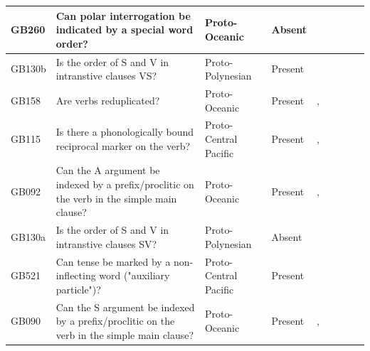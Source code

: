 \documentclass[a4paper,10pt]{article} %
\begin{document}
\begin{landscape}
\begin{longtable}{| p{2cm}| p{3cm}| p{2.5cm}|p{2cm}|p{2cm}|p{2cm}|p{2cm}|p{2cm}|p{2cm}|}
GB260&Can polar interrogation be indicated by a special word order?&Proto-Oceanic&Absent&\citet[89]{lynchrosscrowley_proto_grammar_oceanic}& \cellcolor{hedvig_lightgreen!50}{True Negative} & \cellcolor{hedvig_yellow!50}{Half} & \cellcolor{hedvig_yellow!50}{True Negative} & \cellcolor{hedvig_yellow!50}{True Negative} \\ \hline
GB130b&Is the order of S and V in intranstive clauses VS?&Proto-Polynesian&Present&\citet[122]{kikusawa2002proto}& \cellcolor{hedvig_yellow!50}{Half} & \cellcolor{hedvig_yellow!50}{Half} & \cellcolor{hedvig_lightgreen!50}{True Positive} & \cellcolor{hedvig_lightgreen!50}{True Positive} \\ \hline
GB158&Are verbs reduplicated?&Proto-Oceanic&Present&\citet[84]{lynchrosscrowley_proto_grammar_oceanic}, \citet[112]{evans2003study}& \cellcolor{hedvig_yellow!50}{Half} & \cellcolor{hedvig_yellow!50}{Half} & \cellcolor{hedvig_lightgreen!50}{True Positive} & \cellcolor{hedvig_lightgreen!50}{True Positive} \\ \hline
GB115&Is there a phonologically bound reciprocal marker on the verb?&Proto-Central Pacific&Present&\citet[352]{pawley1970change}, \citet[83]{lynchrosscrowley_proto_grammar_oceanic}& \cellcolor{hedvig_lightgreen!50}{True Positive} & \cellcolor{hedvig_yellow!50}{Half} & \cellcolor{hedvig_lightgreen!50}{True Positive} & \cellcolor{hedvig_yellow!50}{Half} \\ \hline
GB092&Can the A argument be indexed by a prefix/proclitic on the verb in the simple main clause?&Proto-Oceanic&Present&\citet[498-499]{ross2004morphosyntactic}, \citet[83]{lynchrosscrowley_proto_grammar_oceanic}& \cellcolor{hedvig_yellow!50}{Half} & \cellcolor{hedvig_yellow!50}{Half} & \cellcolor{hedvig_lightgreen!50}{True Positive} & \cellcolor{hedvig_lightgreen!50}{True Positive} \\ \hline
GB130a&Is the order of S and V in intranstive clauses SV?&Proto-Polynesian&Absent&\citet[122]{kikusawa2002proto}& \cellcolor{hedvig_yellow!50}{Half} & \cellcolor{hedvig_yellow!50}{Half} & \cellcolor{hedvig_yellow!50}{True Negative} & \cellcolor{hedvig_yellow!50}{True Negative} \\ \hline
GB521&Can tense be marked by a non-inflecting word ("auxiliary particle")?&Proto-Central Pacific&Present&\citet[347]{pawley1970change}& \cellcolor{hedvig_lightgreen!50}{True Positive} & \cellcolor{hedvig_yellow!50}{Half} & \cellcolor{hedvig_lightgreen!50}{True Positive} & \cellcolor{hedvig_yellow!50}{Half} \\ \hline
GB090&Can the S argument be indexed by a prefix/proclitic on the verb in the simple main clause?&Proto-Oceanic&Present&\citet[498-499]{ross2004morphosyntactic}, \citet[83]{lynchrosscrowley_proto_grammar_oceanic}& \cellcolor{hedvig_yellow!50}{Half} & \cellcolor{hedvig_yellow!50}{Half} & \cellcolor{hedvig_lightgreen!50}{True Positive} & \cellcolor{hedvig_lightgreen!50}{True Positive} \\ \hline

\end{longtable}
\end{landscape}
\end{document}
